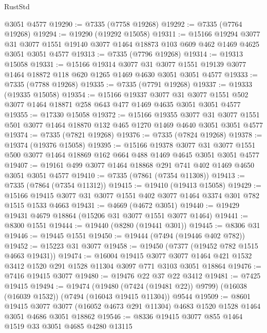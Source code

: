 \begin{lexlean}{RustStd}
\begin{coremodule}
    @3051
    @4577
@19290 := @7335 (@7758 @19268)
@19292 := @7335 (@7764 @19268)
@19294 := @19290 (@19292 @15058)
@19311 := @15166
    @19294
    @3077
    @31
    @3077
    @1551
    @19140
    @3077
    @1464
    @18873
    @103
    @609
    @462
    @1469
    @4625
    @3051
    @3051
    @4577
@19313 := @7335 (@7796 @19268)
@19314 := @19313 @15058
@19331 := @15166
    @19314
    @3077
    @31
    @3077
    @1551
    @19139
    @3077
    @1464
    @18872
    @118
    @620
    @1265
    @1469
    @4630
    @3051
    @3051
    @4577
@19333 := @7335 (@7788 @19268)
@19335 := @7335 (@7791 @19268)
@19337 := @19333 (@19335 @15058)
@19354 := @15166
    @19337
    @3077
    @31
    @3077
    @1551
    @502
    @3077
    @1464
    @18871
    @258
    @643
    @477
    @1469
    @4635
    @3051
    @3051
    @4577
@19355 := @17330 @15058
@19372 := @15166
    @19355
    @3077
    @31
    @3077
    @1551
    @501
    @3077
    @1464
    @18870
    @132
    @465
    @1270
    @1469
    @4640
    @3051
    @3051
    @4577
@19374 := @7335 (@7821 @19268)
@19376 := @7335 (@7824 @19268)
@19378 := @19374 (@19376 @15058)
@19395 := @15166
    @19378
    @3077
    @31
    @3077
    @1551
    @500
    @3077
    @1464
    @18869
    @162
    @664
    @488
    @1469
    @4645
    @3051
    @3051
    @4577
@19407 := @19161 @499 @3077 @1464 @18868 @291 @741 @402 @1469 @4650 @3051 @3051 @4577
@19410 := @7335 (@7861 (@7354 @11308))
@19413 := @7335 (@7864 (@7354 @11312))
@19415 := @19410 (@19413 @15058)
@19429 := @15166 @19415 @3077 @31 @3077 @1551 @402 @3077 @1464 @3374 @301 @782 @1515 @1533 @4663
@19431 := @4669 (@4672 @3051)
@19440 := @19429 @19431 @4679 @18864 (@15206 @31 @3077 @1551 @3077 @1464)
@19441 := @8300 @1551
@19444 := @19440 (@8280 (@19441 @301))
@19445 := @8306 @31
@19446 := @19445 @1551
@19450 := @19444 (@7494 (@19446 @402 @782))
@19452 := @15223 @31 @3077
@19458 := @19450 (@7377 (@19452 @782 @1515 @4663 @19431))
@19474 := @16004
    @19415
    @3077
    @3077
    @1464
    @421
    @1532
    @3412
    @1520
    @291
    @1528
    @11304
    @3097
    @771
    @3103
    @3051
    @18864
@19476 := @7416 @19415 @3077
@19480 := @19476 @22 @37 @22 @3412
@19481 := @7425 @19415
@19494 := @19474
    (@19480 (@7424 (@19481 @22)) @9799)
    (@16038 (@16039 @1532))
    (@7494 (@16043 @19415 @11304))
    @9544
@19509 := @8601
    @19415
    @3077
    @3077
    (@16052 @4673 @291 @11304)
    @4683
    @1520
    @1528
    @1464
    @3051
    @4686
    @3051
    @18862
@19546 := @8336
    @19415
    @3077
    @855
    @1464
    @1519
    @33
    @3051
    @4685
    @4280
    @13115

\end{coremodule}
\end{lexlean}
